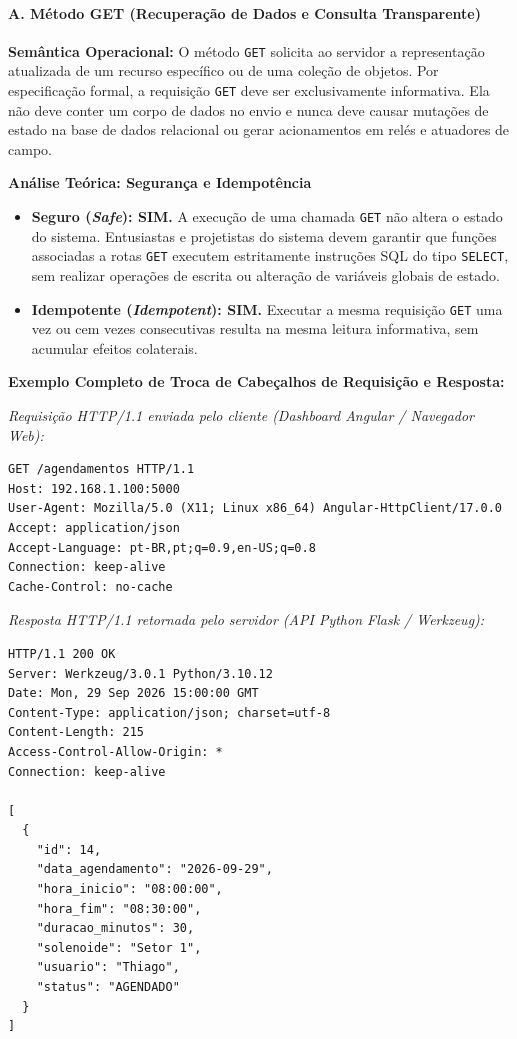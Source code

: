 \paragraph*{A. Método GET (Recuperação de Dados e Consulta Transparente)}

\textbf{Semântica Operacional:} O método \texttt{GET} solicita ao servidor a representação atualizada de um recurso específico ou de uma coleção de objetos. Por especificação formal, a requisição \texttt{GET} deve ser exclusivamente informativa. Ela não deve conter um corpo de dados no envio e nunca deve causar mutações de estado na base de dados relacional ou gerar acionamentos em relés e atuadores de campo.

\textbf{Análise Teórica: Segurança e Idempotência}
\begin{itemize}
    \item \textbf{Seguro (\textit{Safe}): SIM.} A execução de uma chamada \texttt{GET} não altera o estado do sistema. Entusiastas e projetistas do sistema devem garantir que funções associadas a rotas \texttt{GET} executem estritamente instruções SQL do tipo \texttt{SELECT}, sem realizar operações de escrita ou alteração de variáveis globais de estado.
    \item \textbf{Idempotente (\textit{Idempotent}): SIM.} Executar a mesma requisição \texttt{GET} uma vez ou cem vezes consecutivas resulta na mesma leitura informativa, sem acumular efeitos colaterais.
\end{itemize}

\textbf{Exemplo Completo de Troca de Cabeçalhos de Requisição e Resposta:}

\textit{Requisição HTTP/1.1 enviada pelo cliente (Dashboard Angular / Navegador Web):}
\begin{lstlisting}
GET /agendamentos HTTP/1.1
Host: 192.168.1.100:5000
User-Agent: Mozilla/5.0 (X11; Linux x86_64) Angular-HttpClient/17.0.0
Accept: application/json
Accept-Language: pt-BR,pt;q=0.9,en-US;q=0.8
Connection: keep-alive
Cache-Control: no-cache

\end{lstlisting}

\textit{Resposta HTTP/1.1 retornada pelo servidor (API Python Flask / Werkzeug):}
\begin{lstlisting}
HTTP/1.1 200 OK
Server: Werkzeug/3.0.1 Python/3.10.12
Date: Mon, 29 Sep 2026 15:00:00 GMT
Content-Type: application/json; charset=utf-8
Content-Length: 215
Access-Control-Allow-Origin: *
Connection: keep-alive

[
  {
    "id": 14,
    "data_agendamento": "2026-09-29",
    "hora_inicio": "08:00:00",
    "hora_fim": "08:30:00",
    "duracao_minutos": 30,
    "solenoide": "Setor 1",
    "usuario": "Thiago",
    "status": "AGENDADO"
  }
]
\end{lstlisting}

